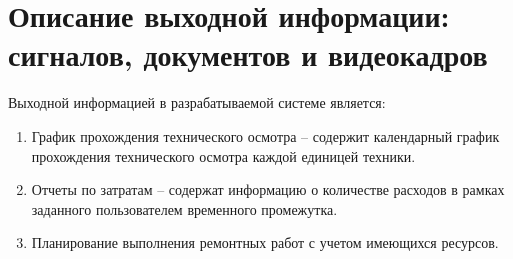 \documentclass[../nirs.tex]{subfiles}
\begin{document}
\section{Описание выходной информации: сигналов, документов и видеокадров}
Выходной информацией в разрабатываемой системе является:
\begin{enumerate}
	\item График прохождения технического осмотра -- содержит календарный график
		прохождения технического осмотра каждой единицей техники.
	\item Отчеты по затратам -- содержат информацию о количестве расходов в
		рамках заданного пользователем временного промежутка.
	\item Планирование выполнения ремонтных работ с учетом имеющихся
        ресурсов.
\end{enumerate}
\end{document}
